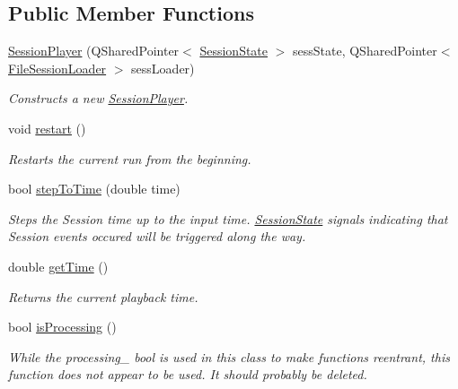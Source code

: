 \subsection*{Public Member Functions}
\begin{DoxyCompactItemize}
\item 
\hyperlink{class_picto_1_1_session_player_a77e91caab8b8fdb0272d2dbe1c289c99}{Session\-Player} (Q\-Shared\-Pointer$<$ \hyperlink{class_picto_1_1_session_state}{Session\-State} $>$ sess\-State, Q\-Shared\-Pointer$<$ \hyperlink{class_picto_1_1_file_session_loader}{File\-Session\-Loader} $>$ sess\-Loader)
\begin{DoxyCompactList}\small\item\em Constructs a new \hyperlink{class_picto_1_1_session_player}{Session\-Player}. \end{DoxyCompactList}\item 
\hypertarget{class_picto_1_1_session_player_ab8096bcc250a2bc24c1b4509816f2da6}{void \hyperlink{class_picto_1_1_session_player_ab8096bcc250a2bc24c1b4509816f2da6}{restart} ()}\label{class_picto_1_1_session_player_ab8096bcc250a2bc24c1b4509816f2da6}

\begin{DoxyCompactList}\small\item\em Restarts the current run from the beginning. \end{DoxyCompactList}\item 
bool \hyperlink{class_picto_1_1_session_player_a6ac568dc380670485040937b9cc9e85c}{step\-To\-Time} (double time)
\begin{DoxyCompactList}\small\item\em Steps the Session time up to the input time. \hyperlink{class_picto_1_1_session_state}{Session\-State} signals indicating that Session events occured will be triggered along the way. \end{DoxyCompactList}\item 
double \hyperlink{class_picto_1_1_session_player_a6051bc0f91563498f813aa749140e4c7}{get\-Time} ()
\begin{DoxyCompactList}\small\item\em Returns the current playback time. \end{DoxyCompactList}\item 
\hypertarget{class_picto_1_1_session_player_a69d706f690e3c8a5eb38bb58fdfbd16d}{bool \hyperlink{class_picto_1_1_session_player_a69d706f690e3c8a5eb38bb58fdfbd16d}{is\-Processing} ()}\label{class_picto_1_1_session_player_a69d706f690e3c8a5eb38bb58fdfbd16d}

\begin{DoxyCompactList}\small\item\em While the processing\-\_\- bool is used in this class to make functions reentrant, this function does not appear to be used. It should probably be deleted. \end{DoxyCompactList}\end{DoxyCompactItemize}


